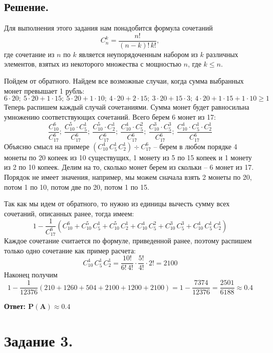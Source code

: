 \documentclass[a4paper, 12pt]{article}
\begin{document}
    \subsection{Решение.}
    Для выполнения этого задания нам понадобится формула сочетаний $$C_{n}^{k}=\dfrac{n!}{(n-k)!\,k!},$$
    где сочетание из $n$ по $k$ является неупорядоченным набором из $k$ различных элементов, взятых из некоторого множества
    с мощностью $n$, где $k\leq n$.


    Пойдем от обратного. Найдем все возможные случаи, когда сумма выбранных монет превышает 1 рубль:
    $$
    6\cdot20;\ 5\cdot 20 + 1\cdot 15;\ 5\cdot20 + 1\cdot 10;\ 4\cdot 20 + 2\cdot 15;\ 3\cdot 20 + 15\cdot 3;\ 4\cdot20 + 1\cdot 15 + 1\cdot 10 \geq 1
    $$
    Теперь распишем каждый случай сочетаниями. Сумма монет будет равносильна умножению соответствующих сочетаний. Всего берем $6$ монет из 17:
    $$
    \dfrac{C_{10}^{6}}{C_{17}^{6}};\ \dfrac{C_{10}^{5}\cdot C_{5}^{1}}{C_{17}^{6}};\ \dfrac{C_{10}^{5}\cdot C_{2}^{1}}{C_{17}^{6}};\ \dfrac{C_{10}^{4}\cdot C_{5}^{2}}{C_{17}^{6}};
    \ \dfrac{C_{10}^{3}\cdot C_{5}^{3}}{C_{17}^{6}};\ \dfrac{C_{10}^{4}\cdot C_{5}^{1}\cdot C_{2}^{1}}{C_{17}^{6}}
    $$
    Объясню смысл на примере $(C_{10}^{4}\,C_{5}^{1}\,C_{2}^{1})\div C_{17}^{6}$ -- берем в любом порядке 4 монеты по 20 копеек из 10 существущих,
    1 монету из 5 по 15 копеек и 1 монету из 2 по 10 копеек. Делим на то, сколько монет берем из скольки -- 6 монет из 17. Порядок не имеет значения, например, мы
    можем сначала взять 2 монеты по 20, потом 1 по 10, потом две по 20, потом 1 по 15.


    Так как мы идем от обратного, то нужно из единицы вычесть сумму всех сочетаний, описанных ранее, тогда имеем:
    $$
    1-\dfrac{1}{C_{17}^{6}}\left(C_{10}^{6}+C_{10}^{5}\,C_{5}^{1}+C_{10}^{5}\,C_{2}^{1}+C_{10}^{4}\,C_{5}^{2}+C_{10}^{3}\,C_{5}^{3}+C_{10}^{4}\,C_{5}^{1}\,C_{2}^{1}\right)
    $$
    Каждое сочетание считается по формуле, приведенной ранее, поэтому распишем только одно сочетание как пример расчета:
    $$
    C_{10}^{4}\,C_{5}^{1}\,C_{2}^{1}=\dfrac{10!}{6!\,4!}\cdot\dfrac{5!}{4!}\cdot 2!=2100
    $$
    Наконец получим
    $$
    1-\dfrac{1}{12376}\left(210+1260+504+2100+1200+2100\right)=1-\dfrac{7374}{12376}=\dfrac{2501}{6188}\approx 0.4
    $$


    \textbf{Ответ: $\mathbf{P(A)\approx 0.4}$}

    
    \section{Задание 3.}
\end{document}
